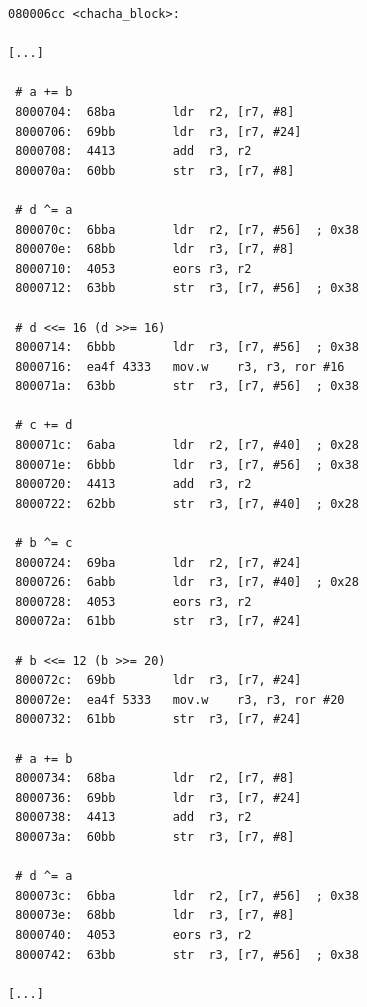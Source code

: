 \documentclass[a4paper,ngerman]{scrreprt}
\begin{document}
\begin{lstlisting}[caption={Assembler-Code, nicht optimiert (-O0)}, label=lst:asm-not-optimized]
080006cc <chacha_block>:

[...]

 # a += b
 8000704:  68ba        ldr  r2, [r7, #8]
 8000706:  69bb        ldr  r3, [r7, #24]
 8000708:  4413        add  r3, r2
 800070a:  60bb        str  r3, [r7, #8]

 # d ^= a
 800070c:  6bba        ldr  r2, [r7, #56]  ; 0x38
 800070e:  68bb        ldr  r3, [r7, #8]
 8000710:  4053        eors r3, r2
 8000712:  63bb        str  r3, [r7, #56]  ; 0x38

 # d <<= 16 (d >>= 16)
 8000714:  6bbb        ldr  r3, [r7, #56]  ; 0x38
 8000716:  ea4f 4333   mov.w    r3, r3, ror #16
 800071a:  63bb        str  r3, [r7, #56]  ; 0x38

 # c += d
 800071c:  6aba        ldr  r2, [r7, #40]  ; 0x28
 800071e:  6bbb        ldr  r3, [r7, #56]  ; 0x38
 8000720:  4413        add  r3, r2
 8000722:  62bb        str  r3, [r7, #40]  ; 0x28

 # b ^= c
 8000724:  69ba        ldr  r2, [r7, #24]
 8000726:  6abb        ldr  r3, [r7, #40]  ; 0x28
 8000728:  4053        eors r3, r2
 800072a:  61bb        str  r3, [r7, #24]

 # b <<= 12 (b >>= 20)
 800072c:  69bb        ldr  r3, [r7, #24]
 800072e:  ea4f 5333   mov.w    r3, r3, ror #20
 8000732:  61bb        str  r3, [r7, #24]

 # a += b
 8000734:  68ba        ldr  r2, [r7, #8]
 8000736:  69bb        ldr  r3, [r7, #24]
 8000738:  4413        add  r3, r2
 800073a:  60bb        str  r3, [r7, #8]

 # d ^= a
 800073c:  6bba        ldr  r2, [r7, #56]  ; 0x38
 800073e:  68bb        ldr  r3, [r7, #8]
 8000740:  4053        eors r3, r2
 8000742:  63bb        str  r3, [r7, #56]  ; 0x38

[...]
\end{lstlisting}
\end{document}
